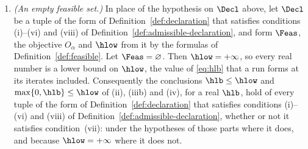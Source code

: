 \begin{theorem}
\begin{enumerate}[label=(\roman*),leftmargin=2.2em]
taken over the \emph{exact} $\Feas^{J}$, and the pairings
$\langle\lmoq_t,\mathbf q_t\rangle$ and $\langle\lmoJ_t,J_t\rangle$ being
kept. At such a $t$ the inequality of \eqref{eq:lmo} on a replaced side is
not asked of $(v_t,S_t)$, and where both sides are replaced no pair
$(v_t,S_t)$ is asked at all: the bracket of \eqref{eq:hlb} at that $t$ is
then
\begin{equation*}
  O^{J}_{\alpha}(x_t)+b^{\mathrm A}_t-\langle\lmoq_t,\mathbf q_t\rangle
  +b^{\mathrm F}_t-\langle\lmoJ_t,J_t\rangle .
\end{equation*}
\item \emph{(An empty feasible set.)} In place of the hypothesis on $\Decl$
above, let $\Decl$ be a tuple of the form of
Definition~\ref{def:declaration} that satisfies conditions (i)--(vi) and
(viii) of Definition~\ref{def:admissible-declaration}, and form $\Feas$, the
objective $O_{\alpha}$ and $\hlow$ from it by the formulas of
Definition~\ref{def:feasible}. Let $\Feas=\varnothing$. Then $\hlow=+\infty$,
so every real number is a lower bound on $\hlow$, the value of
\eqref{eq:hlb} that a run forms at its iterates included. Consequently the
conclusions $\hlb\le\hlow$ and $\max\{0,\hlb\}\le\hlow$ of (ii), (iiib) and
(iv), for a real $\hlb$, hold of every tuple of the form of
Definition~\ref{def:declaration} that satisfies conditions (i)--(vi) and
(viii) of Definition~\ref{def:admissible-declaration}, whether or not it
satisfies condition~(vii): under the hypotheses of those parts where it does,
and because $\hlow=+\infty$ where it does not.
\end{enumerate}
\end{theorem}

